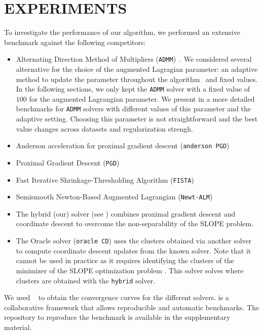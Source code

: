 \section{EXPERIMENTS}\label{sec:experiments}

To investigate the performance of our algorithm, we performed an extensive benchmark against the following competitors:
\begin{itemize}[noitemsep]
  \item Alternating Direction Method of Multipliers (\texttt{ADMM})~\parencite{boyd2010}.
  We considered several alternative for the choice of the augmented Lagragian parameter: an adaptive method to update the parameter throughout the algorithm~\parencite[Sec. 3.4.1]{boyd2010} and fixed values.
  In the following sections, we only kept the \texttt{ADMM} solver with a fixed value of $100$ for the augmented Lagrangian parameter.
  We present in  a more detailed benchmarks for \texttt{ADMM} solvers with different values of this parameter and the adaptive setting.
  Choosing this parameter is not straightforward and the best value changes across datasets and regularization strengh.
  \item Anderson acceleration for proximal gradient descent (\texttt{anderson PGD})~\parencite{zhang2020}
  \item Proximal Gradient Descent (\texttt{PGD})~\parencite{combettes2005}
  \item Fast Iterative Shrinkage-Thresholding Algorithm (\texttt{FISTA})~\parencite{beck2009}
  \item Semismooth Newton-Based Augmented Lagrangian (\texttt{Newt-ALM})~\parencite{Ziyan2019}

  \item The hybrid (our) solver (see ) combines proximal gradient descent
        and coordinate descent to overcome the non-separability of the SLOPE problem.
  \item The Oracle solver (\texttt{oracle CD}) uses the clusters obtained via another solver to compute coordinate descent updates from the known solver.
  Note that it cannot be used in practice as it requires identifying the clusters of the minimizer of the SLOPE optimization problem . This solver solves  where clusters are obtained with the \texttt{hybrid} solver.
\end{itemize}

We used ~\parencite{moreau2022benchopt} to obtain the convergence curves for the different solvers.
 is a collaborative framework that allows reproducible and automatic benchmarks.
The repository to reproduce the benchmark is available in the supplementary material.

